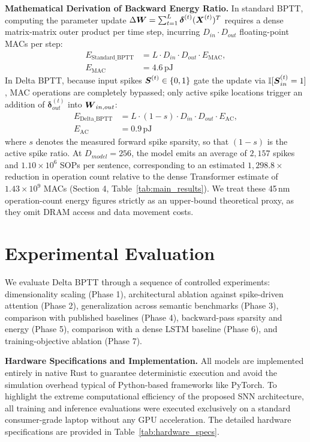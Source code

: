 \documentclass[11pt, conference, compsoc, twoside]{IEEEtran}
\begin{document}
\textbf{Mathematical Derivation of Backward Energy Ratio.} In standard BPTT, computing the parameter update $\Delta \boldsymbol{W} = \sum_{t=1}^L \boldsymbol{\delta}^{(t)} (\boldsymbol{X}^{(t)})^T$ requires a dense matrix-matrix outer product per time step, incurring $D_{in} \cdot D_{out}$ floating-point MACs per step:
\begin{equation}
\begin{aligned}
E_{\text{Standard\_BPTT}} &= L \cdot D_{in} \cdot D_{out} \cdot E_{\text{MAC}}, \\
E_{\text{MAC}} &= 4.6\,\text{pJ}
\end{aligned}
\end{equation}
In Delta BPTT, because input spikes $\boldsymbol{S}^{(t)} \in \{0, 1\}$ gate the update via $\mathbb{I}[\boldsymbol{S}_{in}^{(t)}=1]$, MAC operations are completely bypassed; only active spike locations trigger an addition of $\bm{\delta}_{out}^{(t)}$ into $\boldsymbol{W}_{in, out}$:
\begin{equation}
\begin{aligned}
E_{\text{Delta\_BPTT}} &= L \cdot (1-s) \cdot D_{in} \cdot D_{out} \cdot E_{\text{AC}}, \\
E_{\text{AC}} &= 0.9\,\text{pJ}
\end{aligned}
\end{equation}
where $s$ denotes the measured forward spike sparsity, so that $(1-s)$ is the active spike ratio. At $D_{model}=256$, the model emits an average of $2{,}157$ spikes and $1.10 \times 10^6$ SOPs per sentence, corresponding to an estimated $1{,}298.8\times$ reduction in operation count relative to the dense Transformer estimate of $1.43 \times 10^9$ MACs (Section 4, Table~\ref{tab:main_results}). We treat these 45\,nm operation-count energy figures strictly as an upper-bound theoretical proxy, as they omit DRAM access and data movement costs.


\section{Experimental Evaluation}

We evaluate Delta BPTT through a sequence of controlled experiments: dimensionality scaling (Phase 1), architectural ablation against spike-driven attention (Phase 2), generalization across semantic benchmarks (Phase 3), comparison with published baselines (Phase 4), backward-pass sparsity and energy (Phase 5), comparison with a dense LSTM baseline (Phase 6), and training-objective ablation (Phase 7).

\textbf{Hardware Specifications and Implementation.} All models are implemented entirely in native Rust to guarantee deterministic execution and avoid the simulation overhead typical of Python-based frameworks like PyTorch. To highlight the extreme computational efficiency of the proposed SNN architecture, all training and inference evaluations were executed exclusively on a standard consumer-grade laptop without any GPU acceleration. The detailed hardware specifications are provided in Table~\ref{tab:hardware_specs}.
\end{document}
